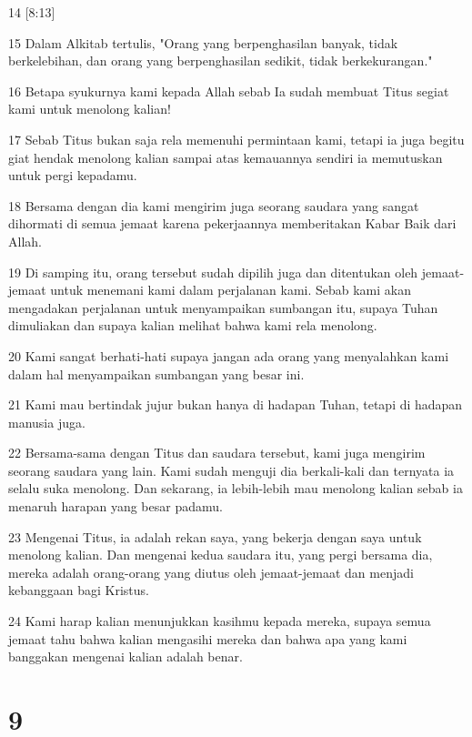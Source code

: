 \par 14 [8:13]
\par 15 Dalam Alkitab tertulis, "Orang yang berpenghasilan banyak, tidak berkelebihan, dan orang yang berpenghasilan sedikit, tidak berkekurangan."
\par 16 Betapa syukurnya kami kepada Allah sebab Ia sudah membuat Titus segiat kami untuk menolong kalian!
\par 17 Sebab Titus bukan saja rela memenuhi permintaan kami, tetapi ia juga begitu giat hendak menolong kalian sampai atas kemauannya sendiri ia memutuskan untuk pergi kepadamu.
\par 18 Bersama dengan dia kami mengirim juga seorang saudara yang sangat dihormati di semua jemaat karena pekerjaannya memberitakan Kabar Baik dari Allah.
\par 19 Di samping itu, orang tersebut sudah dipilih juga dan ditentukan oleh jemaat-jemaat untuk menemani kami dalam perjalanan kami. Sebab kami akan mengadakan perjalanan untuk menyampaikan sumbangan itu, supaya Tuhan dimuliakan dan supaya kalian melihat bahwa kami rela menolong.
\par 20 Kami sangat berhati-hati supaya jangan ada orang yang menyalahkan kami dalam hal menyampaikan sumbangan yang besar ini.
\par 21 Kami mau bertindak jujur bukan hanya di hadapan Tuhan, tetapi di hadapan manusia juga.
\par 22 Bersama-sama dengan Titus dan saudara tersebut, kami juga mengirim seorang saudara yang lain. Kami sudah menguji dia berkali-kali dan ternyata ia selalu suka menolong. Dan sekarang, ia lebih-lebih mau menolong kalian sebab ia menaruh harapan yang besar padamu.
\par 23 Mengenai Titus, ia adalah rekan saya, yang bekerja dengan saya untuk menolong kalian. Dan mengenai kedua saudara itu, yang pergi bersama dia, mereka adalah orang-orang yang diutus oleh jemaat-jemaat dan menjadi kebanggaan bagi Kristus.
\par 24 Kami harap kalian menunjukkan kasihmu kepada mereka, supaya semua jemaat tahu bahwa kalian mengasihi mereka dan bahwa apa yang kami banggakan mengenai kalian adalah benar.

\chapter{9}


